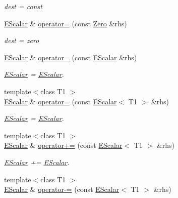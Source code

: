 \begin{DoxyCompactItemize}
\begin{DoxyCompactList}\small\item\em dest = const \end{DoxyCompactList}\item 
\mbox{\hyperlink{classENSEM_1_1EScalar}{E\+Scalar}} \& \mbox{\hyperlink{classENSEM_1_1EScalar_a9619fd24baf50fd03986c3056a484cb9}{operator=}} (const \mbox{\hyperlink{structENSEM_1_1Zero}{Zero}} \&rhs)
\begin{DoxyCompactList}\small\item\em dest = zero \end{DoxyCompactList}\item 
\mbox{\hyperlink{classENSEM_1_1EScalar}{E\+Scalar}} \& \mbox{\hyperlink{classENSEM_1_1EScalar_ade0daedd37868c24651613bb6f499fd4}{operator=}} (const \mbox{\hyperlink{classENSEM_1_1EScalar}{E\+Scalar}} \&rhs)
\begin{DoxyCompactList}\small\item\em \mbox{\hyperlink{classENSEM_1_1EScalar}{E\+Scalar}} = \mbox{\hyperlink{classENSEM_1_1EScalar}{E\+Scalar}}. \end{DoxyCompactList}\item 
{\footnotesize template$<$class T1 $>$ }\\\mbox{\hyperlink{classENSEM_1_1EScalar}{E\+Scalar}} \& \mbox{\hyperlink{classENSEM_1_1EScalar_a8ec804b8b082a748bb364fbb4a511757}{operator=}} (const \mbox{\hyperlink{classENSEM_1_1EScalar}{E\+Scalar}}$<$ T1 $>$ \&rhs)
\begin{DoxyCompactList}\small\item\em \mbox{\hyperlink{classENSEM_1_1EScalar}{E\+Scalar}} = \mbox{\hyperlink{classENSEM_1_1EScalar}{E\+Scalar}}. \end{DoxyCompactList}\item 
{\footnotesize template$<$class T1 $>$ }\\\mbox{\hyperlink{classENSEM_1_1EScalar}{E\+Scalar}} \& \mbox{\hyperlink{classENSEM_1_1EScalar_aa34f8bd686adb144a6d0e5e8f69787ce}{operator+=}} (const \mbox{\hyperlink{classENSEM_1_1EScalar}{E\+Scalar}}$<$ T1 $>$ \&rhs)
\begin{DoxyCompactList}\small\item\em \mbox{\hyperlink{classENSEM_1_1EScalar}{E\+Scalar}} += \mbox{\hyperlink{classENSEM_1_1EScalar}{E\+Scalar}}. \end{DoxyCompactList}\item 
{\footnotesize template$<$class T1 $>$ }\\\mbox{\hyperlink{classENSEM_1_1EScalar}{E\+Scalar}} \& \mbox{\hyperlink{classENSEM_1_1EScalar_a2ed33688ab765d0e4d15b391b3f61f33}{operator-\/=}} (const \mbox{\hyperlink{classENSEM_1_1EScalar}{E\+Scalar}}$<$ T1 $>$ \&rhs)

\end{DoxyCompactItemize}
